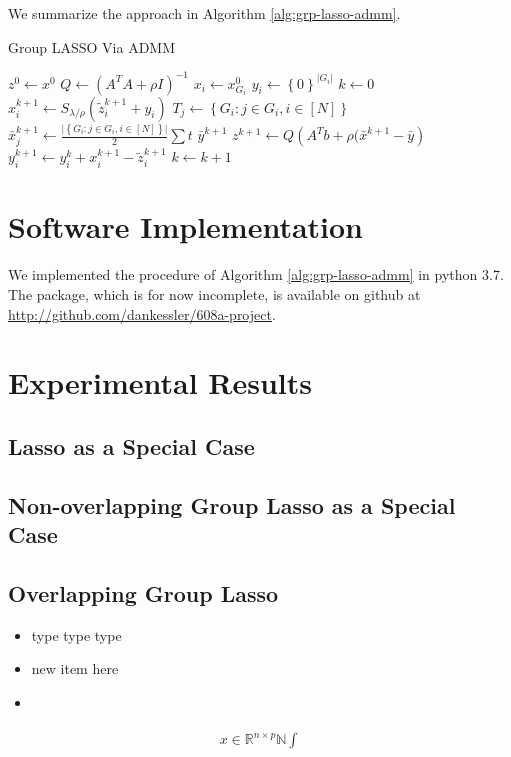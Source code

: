 \documentclass{article}
\begin{document}
We summarize the approach in Algorithm \ref{alg:grp-lasso-admm}.
\begin{algorithm}
    \caption{Group LASSO Via ADMM}
    \label{alg:grp-lasso-admm}
    \begin{algorithmic}[1]
      \State $z^0 \gets x^0$
      \State $Q \gets (A^TA + \rho I)^{-1}$
      \State $x_i \gets x^0_{G_i}$
      \State $y_i \gets \left\{ 0 \right\}^{\lvert G_i \rvert}$
      \EndFor
      \State $k \gets 0$ 
      \State $x_i^{k+1} \gets S_{\lambda/\rho}(\tilde{z}_i^{k+1} + y_i)$
      \EndFor
      \State $T_j \gets \left\{ G_i: j \in G_i, i \in [N] \right\}$
      \State $\bar{x}_j^{k+1} \gets \frac{\lvert \left\{ G_i : j \in G_i, i \in [N] \right\} \rvert}{2} \sum t $ %
      \EndFor
      \State $\bar{y}^{k+1}$ %
      \State $z^{k+1} \gets Q \left( A^Tb + \rho(\bar{x}^{k+1} - \bar{y} \right)$
      \State $y_i^{k+1} \gets y_i^k + x_i^{k+1} - \tilde{z}_i^{k+1} $
      \EndFor
      \State $k \gets k+1$
      \EndWhile
  \end{algorithmic}
\end{algorithm}

\section{Software Implementation}
\label{sec:implementation}
We implemented the procedure of Algorithm \ref{alg:grp-lasso-admm} in python 3.7.
The package, which is for now incomplete, is available on github at \url{http://github.com/dankessler/608a-project}.

\section{Experimental Results}
\label{sec:experimental-results}

\subsection{Lasso as a Special Case}
\label{sec:lasso-as-special}

\subsection{Non-overlapping Group Lasso as a Special Case}
\label{sec:non-overl-group}

\subsection{Overlapping Group Lasso}
\label{sec:overl-group-lasso}

\begin{itemize}
\item type type type
\item new item here
\item 
\end{itemize}

\begin{align*}
  \label{eq:14}
  x \in \mathbb{R}^{n \times p} \mathbb{N} \int\limits_{}^{}
\end{align*}

\printbibliography
\end{document}

